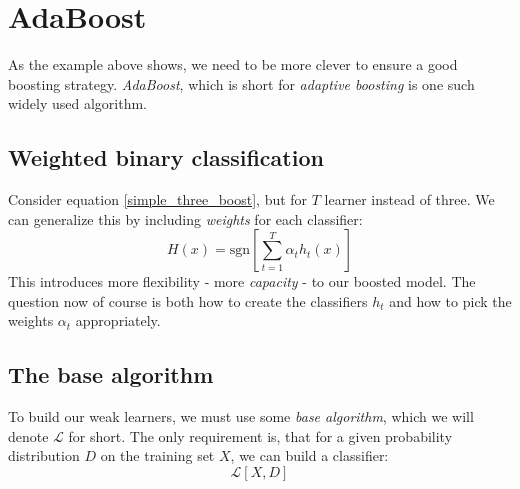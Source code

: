 \documentclass[12pt, a4paper]{article}
\numberwithin{equation}{section}
\begin{document}
\section{AdaBoost}
As the example above shows, we need to be more clever to ensure a good boosting strategy. \textit{AdaBoost}, which is short for \textit{adaptive boosting} is one such widely used algorithm.

\subsection{Weighted binary classification}
Consider equation \ref{simple_three_boost}, but for $T$ learner instead of three. We can generalize this by including \textit{weights} for each classifier:
\begin{equation}
H(x)=\textrm{sgn}\left[\sum_{t=1}^T \alpha_t h_t(x)\right]
\end{equation}
This introduces more flexibility - more \textit{capacity} - to our boosted model. The question now of course is both how to create the classifiers $h_t$ and how to pick the weights $\alpha_t$ appropriately.

\subsection{The base algorithm}
To build our weak learners, we must use some \textit{base algorithm}, which we will denote $\mathcal{L}$ for short. The only requirement is, that for a given probability distribution $D$ on the training set $X$, we can build a classifier:
\begin{equation}
\mathcal{L}[X,D]
\end{equation}
\end{document}
